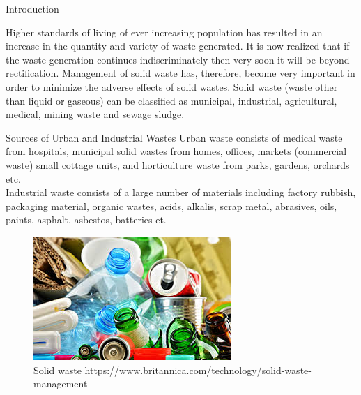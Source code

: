 \documentclass[final]{beamer}
\newlength{\onecolwid}
\begin{document}
\begin{frame}
\begin{columns}[t]
\begin{column}{\onecolwid}
\begin{exampleblock}{Introduction}

Higher standards of living of ever increasing population has resulted in an increase in the quantity and variety of waste generated. It is now realized that if the waste generation continues indiscriminately then very soon it will be beyond rectification. Management of solid waste has, therefore, become very important in order to minimize the adverse effects of solid wastes. Solid waste (waste other than liquid or gaseous) can be classified as municipal, industrial, agricultural, medical, mining waste and sewage sludge.
\end{exampleblock}


\begin{exampleblock}{Sources of Urban and Industrial Wastes}
Urban waste consists of medical waste from hospitals, municipal solid wastes from homes, offices, markets (commercial waste) small cottage units, and horticulture waste from parks, gardens, orchards etc.\\
Industrial waste consists of a large number of materials including factory rubbish, packaging material, organic wastes, acids, alkalis, scrap metal, abrasives, oils, paints, asphalt, asbestos, batteries et. 
\end{exampleblock}


\begin{figure}
\includegraphics[width=1\linewidth]{img/swaste.jpg}
\caption{Solid waste \smallskip https://www.britannica.com/technology/solid-waste-management}
\end{figure}


\end{column}
\end{columns}
\end{frame}
\end{document}
